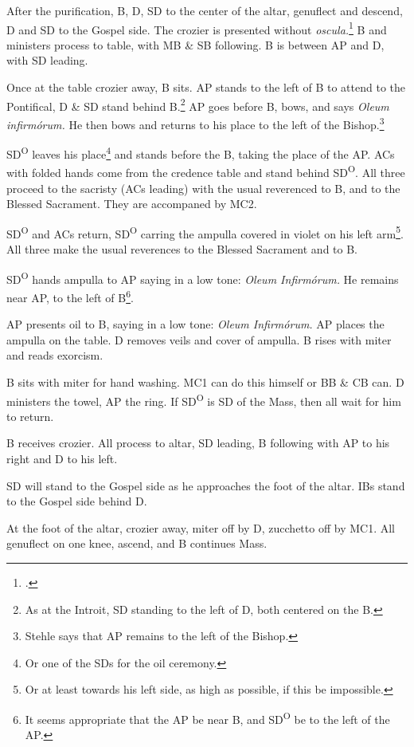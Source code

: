 {\rubric After the purification, B, D, SD to the center of the altar, genuflect
and descend, D and SD to the Gospel side. The crozier is presented without
\textit{oscula.}\footcite[184]{stehle} B and ministers process to table, with
MB \& SB following. B is between AP and D, with SD leading.

\rubric Once at the table crozier away, B sits. AP stands to the left of B to
attend to the Pontifical, D \& SD stand behind B.\footnote{As at the Introit,
SD standing to the left of D, both centered on the B.} AP goes before B, bows,
and says \textit{Oleum infirmórum.} He then bows and returns to his place to
the left of the Bishop.\footnote{Stehle says that AP remains to the left of the
Bishop.}

\rubric SD\textsuperscript{O} leaves his place\footnote{Or one of the SDs for
the oil ceremony.} and stands before the B, taking the place of the AP. ACs
with folded hands come from the credence table and stand behind
SD\textsuperscript{O}. All three proceed to the sacristy (ACs leading) with the
usual reverenced to B, and to the Blessed Sacrament. They are accompaned by
MC2.

\rubric SD\textsuperscript{O} and ACs return, SD\textsuperscript{O} carring the
ampulla covered in violet on his left arm\footnote{Or at least towards his left
side, as high as possible, if this be impossible.}. All three make the usual
reverences to the Blessed Sacrament and to B.

\rubric SD\textsuperscript{O} hands ampulla to AP saying in a low tone:
\textit{Oleum Infirmórum.} He remains near AP, to the left of B\footnote{It
seems appropriate that the AP be near B, and SD\textsuperscript{O} be to the
left of the AP.}.

\rubric AP presents oil to B, saying in a low tone: \textit{Oleum Infirmórum.}
AP places the ampulla on the table. D removes veils and cover of ampulla. B
rises with miter and reads exorcism.

\rubric B sits with miter for hand washing. MC1 can do this himself or BB \& CB
can. D ministers the towel, AP the ring. If SD\textsuperscript{O} is SD of the
Mass, then all wait for him to return. 

\rubric B receives crozier. All process to altar, SD leading, B following with
AP to his right and D to his left.

\rubric SD will stand to the Gospel side as he approaches the foot of the
altar. IBs stand to the Gospel side behind D.

\rubric At the foot of the altar, crozier away, miter off by D, zucchetto off
by MC1. All genuflect on one knee, ascend, and B continues Mass.

}
